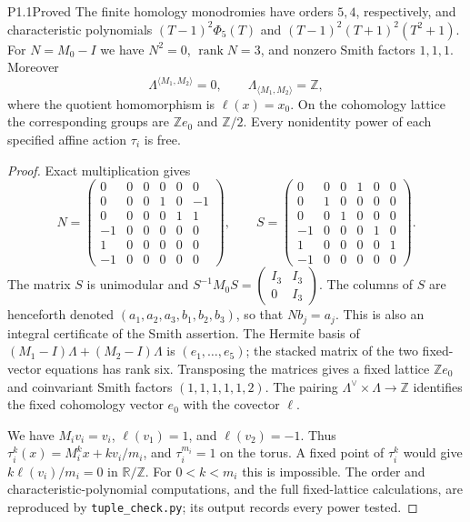 \begin{statement}{P1.1}{Proved}
The finite homology monodromies have orders $5,4$, respectively, and
characteristic polynomials
$(T-1)^2\Phi _5(T)$ and $(T-1)^2(T+1)^2(T^2+1)$.
For $N=M_0-I$ we have $N^2=0$, $\operatorname{rank}N=3$, and
nonzero Smith factors $1,1,1$.  Moreover
\[
 \Lambda^{\langle M_1,M_2\rangle}=0,\qquad
 \Lambda_{\langle M_1,M_2\rangle}=\mathbb Z,
\]
where the quotient homomorphism is $\ell(x)=x_0$.
On the cohomology lattice the corresponding groups are $\mathbb Ze_0$
and $\mathbb Z/2$.  Every nonidentity power of each specified affine
action $\tau_i$ is free.
\end{statement}
\begin{proof}
Exact multiplication gives
\[
N=\begin{pmatrix}
0&0&0&0&0&0\\0&0&0&1&0&-1\\0&0&0&0&1&1\\
-1&0&0&0&0&0\\1&0&0&0&0&0\\-1&0&0&0&0&0
\end{pmatrix},\qquad
S=\begin{pmatrix}
0&0&0&1&0&0\\0&1&0&0&0&0\\0&0&1&0&0&0\\
-1&0&0&0&1&0\\1&0&0&0&0&1\\-1&0&0&0&0&0
\end{pmatrix}.
\]
The matrix $S$ is unimodular and
$S^{-1}M_0S=\left(\begin{smallmatrix}I_3&I_3\\0&I_3\end{smallmatrix}\right)$.
The columns of $S$ are henceforth denoted
$(a_1,a_2,a_3,b_1,b_2,b_3)$, so that $Nb_j=a_j$.
This is also an integral certificate of the Smith assertion.
The Hermite basis of
$(M_1-I)\Lambda+(M_2-I)\Lambda$ is $(e_1,\ldots,e_5)$;
the stacked matrix of the two fixed-vector equations has rank six.
Transposing the matrices gives a fixed lattice $\mathbb Ze_0$ and
coinvariant Smith factors $(1,1,1,1,1,2)$.  The pairing
$\Lambda^\vee\times\Lambda\longrightarrow\mathbb Z$ identifies the
fixed cohomology vector $e_0$ with the covector $\ell$.

We have $M_iv_i=v_i$, $\ell(v_1)=1$, and $\ell(v_2)=-1$.
Thus $\tau_i^k(x)=M_i^kx+kv_i/m_i$, and $\tau_i^{m_i}=1$ on the
torus.  A fixed point of $\tau_i^k$ would give
$k\ell(v_i)/m_i=0$ in $\mathbb R/\mathbb Z$.  For
$0<k<m_i$ this is impossible.  The order and characteristic-polynomial
computations, and the full fixed-lattice calculations, are reproduced by
\texttt{tuple\_check.py}; its output records every power tested.
\end{proof}

